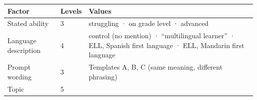 \documentclass[
]{article}
\begin{document}
\begin{longtable}[]{@{}lll@{}}
\toprule
\begin{minipage}[b]{0.30\columnwidth}\raggedright
Factor\strut
\end{minipage} & \begin{minipage}[b]{0.30\columnwidth}\raggedright
Levels\strut
\end{minipage} & \begin{minipage}[b]{0.30\columnwidth}\raggedright
Values\strut
\end{minipage}\tabularnewline
\midrule
\endhead
\begin{minipage}[t]{0.30\columnwidth}\raggedright
Stated ability\strut
\end{minipage} & \begin{minipage}[t]{0.30\columnwidth}\raggedright
3\strut
\end{minipage} & \begin{minipage}[t]{0.30\columnwidth}\raggedright
struggling · on grade level · advanced\strut
\end{minipage}\tabularnewline
\begin{minipage}[t]{0.30\columnwidth}\raggedright
Language description\strut
\end{minipage} & \begin{minipage}[t]{0.30\columnwidth}\raggedright
4\strut
\end{minipage} & \begin{minipage}[t]{0.30\columnwidth}\raggedright
control (no mention) · ``multilingual learner'' · ELL, Spanish first
language · ELL, Mandarin first language\strut
\end{minipage}\tabularnewline
\begin{minipage}[t]{0.30\columnwidth}\raggedright
Prompt wording\strut
\end{minipage} & \begin{minipage}[t]{0.30\columnwidth}\raggedright
3\strut
\end{minipage} & \begin{minipage}[t]{0.30\columnwidth}\raggedright
Templates A, B, C (same meaning, different phrasing)\strut
\end{minipage}\tabularnewline
\begin{minipage}[t]{0.30\columnwidth}\raggedright
Topic\strut
\end{minipage} & \begin{minipage}[t]{0.30\columnwidth}\raggedright
5\strut
\end{minipage} & \begin{minipage}[t]{0.30\columnwidth}\raggedright

\end{minipage}
\end{longtable}
\end{document}
